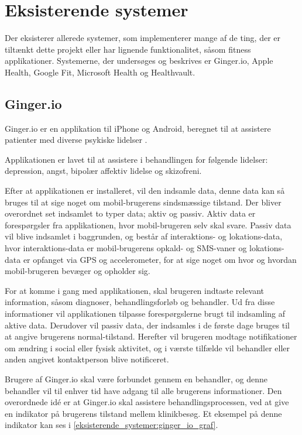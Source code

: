 \section{Eksisterende systemer}
Der eksisterer allerede systemer, som implementerer mange af de ting, der er tiltænkt dette projekt eller har lignende funktionalitet, såsom fitness applikationer. 
Systemerne, der undersøges og beskrives er Ginger.io, Apple Health, Google Fit, Microsoft Health og Healthvault.

\subsection{Ginger.io}
Ginger.io er en applikation til iPhone og Android, beregnet til at assistere patienter med diverse psykiske lidelser \citep{ginger_dot_io,gingerio_mit,gingerio_dailymail}.

Applikationen er lavet til at assistere i behandlingen for følgende lidelser: depression, angst, bipolær affektiv lidelse og skizofreni.

Efter at applikationen er installeret, vil den indsamle data, denne data kan så bruges til at sige noget om mobil-brugerens sindsmæssige tilstand.
Der bliver overordnet set indsamlet to typer data; aktiv og passiv.
Aktiv data er forespørgsler fra applikationen, hvor mobil-brugeren selv skal svare.
Passiv data vil blive indsamlet i baggrunden, og består af interaktions- og lokations-data, hvor interaktions-data er mobil-brugerens opkald- og SMS-vaner og lokations-data er opfanget via GPS og accelerometer, for at sige noget om hvor og hvordan mobil-brugeren bevæger og opholder sig.

For at komme i gang med applikationen, skal brugeren indtaste relevant information, såsom diagnoser, behandlingsforløb og behandler.
Ud fra disse informationer vil applikationen tilpasse forespørgslerne brugt til indsamling af aktive data.
Derudover vil passiv data, der indsamles i de første dage bruges til at angive brugerens normal-tilstand.
Herefter vil brugeren modtage notifikationer om ændring i social eller fysisk aktivitet, og i værste tilfælde vil behandler eller anden angivet kontaktperson blive notificeret.

Brugere af Ginger.io skal være forbundet gennem en behandler, og denne behandler vil til enhver tid have adgang til alle brugerens informationer.
Den overordnede idé er at Ginger.io skal assistere behandlingsprocessen, ved at give en indikator på brugerens tilstand mellem klinikbesøg. 
Et eksempel på denne indikator kan ses i \cref{eksisterende_systemer:ginger_io_graf}.

